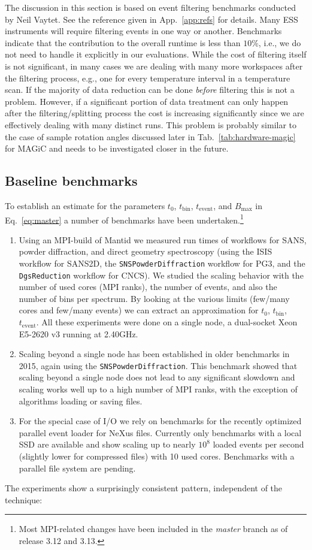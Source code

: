 \documentclass[a4paper,english,numbers=noenddot,bibliography=totoc,chapterprefix=on,DIV=12]{scrartcl}
\newcommand{\Tbin}{t_{\text{bin}}}
\newcommand{\Tevent}{t_{\text{event}}}
\newcommand{\Bmax}{B_{\text{max}}}
\newcommand{\magic}{MAGiC\xspace}
\newcommand{\mantid}{Mantid\xspace}
\newcommand{\nexus}{NeXus\xspace}
\begin{document}
The discussion in this section is based on event filtering benchmarks conducted by Neil Vaytet.
See the reference given in App.~\ref{app:refs} for details.
Many ESS instruments will require filtering events in one way or another.
Benchmarks indicate that the contribution to the overall runtime is less than $10\%$, i.e., we do not need to handle it explicitly in our evaluations.
While the cost of filtering itself is not significant, in many cases we are dealing with many more workspaces after the filtering process, e.g., one for every temperature interval in a temperature scan.
If the majority of data reduction can be done \emph{before} filtering this is not a problem.
However, if a significant portion of data treatment can only happen after the filtering/splitting process the cost is increasing significantly since we are effectively dealing with many distinct runs.
This problem is probably similar to the case of sample rotation angles discussed later in Tab.~\ref{tab:hardware-magic} for \magic and needs to be investigated closer in the future.


\subsection{Baseline benchmarks}
\label{sec:benchmarks}

To establish an estimate for the parameters $t_0$, $\Tbin$, $\Tevent$, and $\Bmax$ in Eq.~\eqref{eq:master} a number of benchmarks have been undertaken.\footnote{Most MPI-related changes have been included in the \emph{master} branch as of release 3.12 and 3.13.}

\begin{enumerate}
  \item Using an MPI-build of \mantid we measured run times of workflows for SANS, powder diffraction, and direct geometry spectroscopy (using the ISIS workflow for SANS2D, the \verb|SNSPowderDiffraction| workflow for PG3, and the \verb|DgsReduction| workflow for CNCS).
    We studied the scaling behavior with the number of used cores (MPI ranks), the number of events, and also the number of bins per spectrum.
    By looking at the various limits (few/many cores and few/many events) we can extract an approximation for $t_0$, $\Tbin$, $\Tevent$.
    All these experiments were done on a single node, a dual-socket Xeon E5-2620 v3 running at 2.40GHz.
  \item Scaling beyond a single node has been established in older benchmarks in 2015, again using the \verb|SNSPowderDiffraction|.
    This benchmark showed that scaling beyond a single node does not lead to any significant slowdown and scaling works well up to a high number of MPI ranks, with the exception of algorithms loading or saving files.
  \item For the special case of I/O we rely on benchmarks for the recently optimized parallel event loader for \nexus files.
    Currently only benchmarks with a local SSD are available and show scaling up to nearly $10^8$ loaded events per second (slightly lower for compressed files) with 10 used cores.
    Benchmarks with a parallel file system are pending.
\end{enumerate}
The experiments show a surprisingly consistent pattern, independent of the technique:
\end{document}
